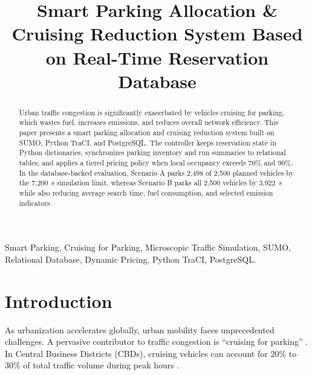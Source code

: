 \documentclass[conference]{IEEEtran}
\begin{document}
\title{Smart Parking Allocation \& Cruising Reduction System Based on Real-Time Reservation Database}

\author{
    \and
}

\maketitle

\begin{abstract}
Urban traffic congestion is significantly exacerbated by vehicles cruising for parking, which wastes fuel, increases emissions, and reduces overall network efficiency. This paper presents a smart parking allocation and cruising reduction system built on SUMO, Python TraCI, and PostgreSQL. The controller keeps reservation state in Python dictionaries, synchronizes parking inventory and run summaries to relational tables, and applies a tiered pricing policy when local occupancy exceeds 70\% and 90\%. In the database-backed evaluation, Scenario A parks 2,498 of 2,500 planned vehicles by the 7,200~s simulation limit, whereas Scenario B parks all 2,500 vehicles by 3,922~s while also reducing average search time, fuel consumption, and selected emission indicators.
\end{abstract}

\begin{IEEEkeywords}
    Smart Parking, Cruising for Parking, Microscopic Traffic Simulation, SUMO, Relational Database, Dynamic Pricing, Python TraCI, PostgreSQL.
\end{IEEEkeywords}

\section{Introduction}
As urbanization accelerates globally, urban mobility faces unprecedented challenges. A pervasive contributor to traffic congestion is ``cruising for parking'' \cite{b1}. In Central Business Districts (CBDs), cruising vehicles can account for 20\% to 30\% of total traffic volume during peak hours \cite{b2}.
\end{document}
